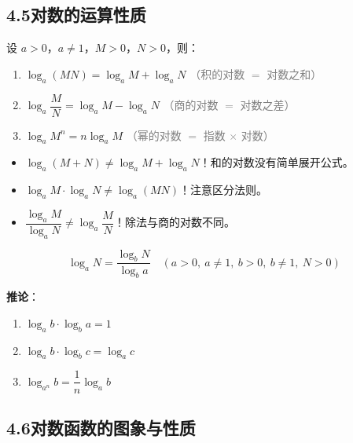 \documentclass[12pt, a4paper]{ctexart}
\begin{document}
\subsection*{4.5\quad 对数的运算性质}

\begin{knowledgebox}[对数运算法则]
设 $a>0$，$a\neq 1$，$M>0$，$N>0$，则：

\begin{enumerate}[leftmargin=2em]
  \item $\boxed{\log_a(MN) = \log_a M + \log_a N}$ \quad \textcolor{gray}{（积的对数 $=$ 对数之和）}
  \item $\boxed{\log_a \dfrac{M}{N} = \log_a M - \log_a N}$ \quad \textcolor{gray}{（商的对数 $=$ 对数之差）}
  \item $\boxed{\log_a M^n = n\log_a M}$ \quad \textcolor{gray}{（幂的对数 $=$ 指数 $\times$ 对数）}
\end{enumerate}
\end{knowledgebox}

\begin{warnbox}[易错提醒]
\begin{itemize}[leftmargin=2em]
  \item $\log_a(M+N) \neq \log_a M + \log_a N$！和的对数没有简单展开公式。
  \item $\log_a M \cdot \log_a N \neq \log_a(MN)$！注意区分法则。
  \item $\dfrac{\log_a M}{\log_a N} \neq \log_a \dfrac{M}{N}$！除法与商的对数不同。
\end{itemize}
\end{warnbox}

\begin{knowledgebox}[换底公式]
\[
\boxed{\log_a N = \dfrac{\log_b N}{\log_b a}} \quad (a>0,\ a\neq 1,\ b>0,\ b\neq 1,\ N>0)
\]

\textbf{推论}：
\begin{enumerate}[leftmargin=2em]
  \item $\log_a b \cdot \log_b a = 1$
  \item $\log_a b \cdot \log_b c = \log_a c$
  \item $\log_{a^n} b = \dfrac{1}{n}\log_a b$
\end{enumerate}
\end{knowledgebox}

\subsection*{4.6\quad 对数函数的图象与性质}
\end{document}

